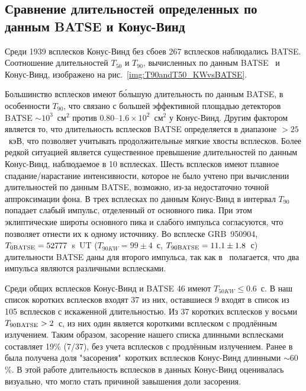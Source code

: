 \begin{landscape}

\end{landscape}

\subsection{Сравнение длительностей определенных по данным BATSE и Конус-Винд}
Среди 1939 всплесков Конус-Винд без сбоев 267 всплесков наблюдались BATSE. 
Соотношение длительностей $T_{50}$ и $T_{90}$, вычисленных по данным BATSE~\citep{Paciesas_1999} 
и Конус-Винд, изображено на рис.~\ref{img:T90andT50_KWvsBATSE}.

Большинство всплесков имеют б\'{о}льшую длительность по данным BATSE, 
в особенности $T_{90}$, что связано с большей  эффективной площадью детекторов 
BATSE $\sim 10^3$~см$^2$ против 0.80--$1.6\times 10^2$~см$^2$ у Конус-Винд. 
Другим фактором является то, что длительность всплесков BATSE определяется в 
диапазоне $>25$~кэВ, что позволяет учитывать продолжительные мягкие хвосты всплесков. 
Более редкой ситуацией является существенное превышение длительностей по данным Конус-Винд, 
наблюдаемое в 10 всплесках. Шесть всплесков имеют плавное спадание/нарастание интенсивности, 
которое не было учтено при вычислении  длительностей по данным BATSE, возможно, 
из-за недостаточно точной аппроксимации фона. В трех всплесках по данным Конус-Винд 
в интервал $T_{90}$ попадает слабый импульс, отделенный от основного пика. 
При этом эклиптические широты основного пика и слабого импульса согласуются, 
что позволяет отнести их к одному источнику. Во всплеске GRB~950904, 
$T_{0 {\mathrm{BATSE}}} = 52777$~s~UT ($T_{90{KW}} = 99 \pm 4$~с, $T_{90{\mathrm{BATSE}}} = 11.1\pm 1.8$~с) 
длительности BATSE даны для второго импульса, так как в~\citep{Hurley_2005} полагается, 
что два импульса являются различными всплесками.

Среди общих всплесков Конус-Винд и BATSE 46 имеют $T_{50{KW}} \leq 0.6$~с. 
В наш список коротких всплесков входят 37 из них, оставшиеся 9 входят в список из 105 
всплесков с искаженной длительностью. Из 37 коротких всплесков у восьми $T_{90{\mathrm{BATSE}}} > 2$~с, 
из них один является короткими всплеском с продлённым излучением. Таким образом, 
засорение нашего списка длинными всплесками составляет 19\% (7/37), без учета 
всплесков с продлённым излучением. Ранее в~\citep{Ofek_2007} была получена доля 
"засорения"\ коротких всплесков Конус-Винд длинными $\sim 60$\%. В этой работе 
длительность всплесков в данных Конус-Винд оценивалась визуально, что могло 
стать причиной завышения доли засорения. 


